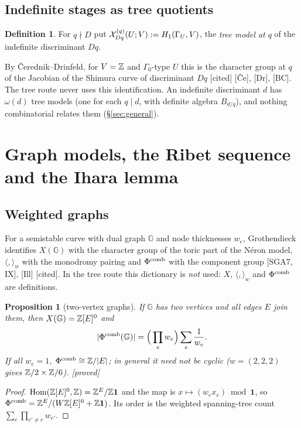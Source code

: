 \documentclass[11pt]{amsart}
\theoremstyle{plain}
\newtheorem{proposition}[theorem]{Proposition}
\theoremstyle{definition}
\newtheorem{definition}[theorem]{Definition}
\theoremstyle{remark}
\newcommand{\status}[1]{\textup{\textsf{[#1]}}}
\newcommand{\stproved}{\status{proved}}
\newcommand{\stcited}{\status{cited}}
\newcommand{\G}{\mathbb{G}}\newcommand{\Iw}{\mathrm{Iw}}\newcommand{\Hb}{\mathfrak{H}}
\DeclareMathOperator{\Hom}{Hom}\DeclareMathOperator{\coker}{coker}\DeclareMathOperator{\End}{End}
\begin{document}
\subsection{Indefinite stages as tree quotients}
\begin{definition}\label{def:indef}
For $q\nmid D$ put $\mathcal{X}^{(q)}_{Dq}(U;V):=H_1(\Gamma_U,V)$, the \emph{tree model at $q$} of the indefinite discriminant $Dq$.
\end{definition}
By Čerednik--Drinfeld, for $V=\mathbb{Z}$ and $\Gamma_0$-type $U$ this is the character group at $q$ of the Jacobian of the Shimura curve of discriminant $Dq$ \stcited{} [Če], [Dr], [BC]. The tree route never uses this identification. An indefinite discriminant $d$ has $\omega(d)$ tree models (one for each $q\mid d$, with definite algebra $B_{d/q}$), and nothing combinatorial relates them (\S\ref{sec:general}).

\section{Graph models, the Ribet sequence and the Ihara lemma}\label{sec:graph}

\subsection{Weighted graphs}
For a semistable curve with dual graph $\G$ and node thicknesses $w_e$, Grothendieck identifies $X(\G)$ with the character group of the toric part of the Néron model, $\langle,\rangle_w$ with the monodromy pairing and $\Phi^{\rm comb}$ with the component group [SGA7, IX], [Ill] \stcited. In the tree route this dictionary is \emph{not} used: $X$, $\langle,\rangle_w$ and $\Phi^{\rm comb}$ are definitions.

\begin{proposition}[two-vertex graphs]\label{prop:phi}
If $\G$ has two vertices and all edges $E$ join them, then $X(\G)=\Z[E]^0$ and
\[|\Phi^{\rm comb}(\G)|=\Big(\prod_ew_e\Big)\sum_e\frac1{w_e}.\]
If all $w_e=1$, $\Phi^{\rm comb}\cong\mathbb{Z}/|E|$; in general it need not be cyclic ($w=(2,2,2)$ gives $\mathbb{Z}/2\times\mathbb{Z}/6$). \stproved
\end{proposition}
\begin{proof}
$\Hom(\Z[E]^0,\Z)=\Z^E/\Z\mathbf 1$ and the map is $x\mapsto(w_ex_e)\bmod\mathbf1$, so $\Phi^{\rm comb}=\mathbb{Z}^E/(W\mathbb{Z}[E]^0+\mathbb{Z}\mathbf1)$. Its order is the weighted spanning-tree count $\sum_e\prod_{e'\ne e}w_{e'}$.
\end{proof}
\end{document}
